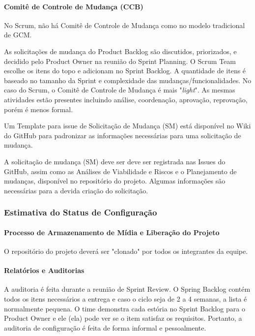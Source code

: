 \paragraph{Comitê de Controle de Mudança (CCB)}

No Scrum, não há Comitê de Controle de Mudança como no modelo tradicional de GCM.

As solicitações de mudança do Product Backlog são discutidos, priorizados, e decidido pelo Product Owner na reunião do Sprint Planning. O Scrum Team escolhe os itens do topo e adicionam no Sprint Backlog. A quantidade de itens é baseado no tamanho da Sprint e complexidade das mudanças/funcionalidades. No caso do Scrum, o Comitê de Controle de Mudança é mais "\textit{light}". As mesmas atividades estão presentes incluindo análise, coordenação, aprovação, reprovação, porém é menos formal.

Um Template para issue de Solicitação de Mudança (SM) está disponível no Wiki do GitHub para padronizar as informações necessárias para uma solicitação de mudança.

A solicitação de mudança (SM) deve ser deve ser registrada nas Issues do GitHub, assim como as Análises de Viabilidade e Riscos e o Planejamento de mudanças, disponível no repositório do projeto. Algumas informações são necessárias para a devida criação do solicitação.

\subsubsection{Estimativa do Status de Configuração}

\paragraph{Processo de Armazenamento de Mídia e Liberação do Projeto}

O repositório do projeto deverá ser "clonado" por todos os integrantes da equipe.

\paragraph{Relatórios e Auditorias}

A auditoria é feita durante a reunião de Sprint Review. O Spring Backlog contém todos os itens necessários a entrega e caso o ciclo seja de 2 a 4 semanas, a lista é normalmente pequena.
O time demonstra cada estória no Sprint Backlog para o Product Owner e ele (ela) pode ver se o item satisfaz os requisitos. Portanto, a auditoria de configuração é feita de forma informal e pessoalmente.

